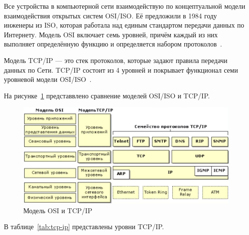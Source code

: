 Все устройства в компьютерной сети взаимодействую по концептуальной модели взаимодействия открытых систем OSI/ISO. 
Её предложили в 1984 году инженеры из ISO, которая работала над единым стандартом передачи данных по Интернету. 
Модель OSI включает семь уровней, причём каждый из них выполняет определённую функцию и определяется набором протоколов~\cite{tcp_ip_reilly, tcp_ip_lora}.

Модель TCP/IP --- это стек протоколов, которые задают правила передачи данных по Сети. TCP/IP состоит из 4 уровней и покрывает функционал семи уровневой модели OSI/ISO~\cite{tcp_ip_reilly, tcp_ip_lora}.

На рисунке~\ref{pr:protocol} представвлено сравнение моделей  OSI/ISO и TCP/IP.

\begin{figure}[h]
	\centering
	\includegraphics[width=1\textwidth]{img/protocol.png}
	\caption{Модель OSI и TCP/IP~\cite{tcp_ip_reilly, tcp_ip_lora}}
	\label{pr:protocol}
\end{figure}

\clearpage

В таблице~\ref{tab:tcp-ip} представлены уровни TCP/IP.

